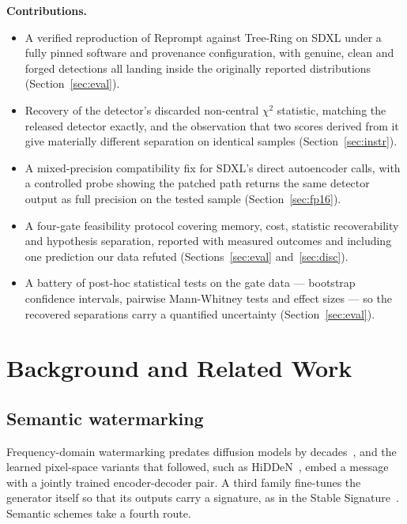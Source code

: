 \documentclass[10pt,twocolumn]{article}
\begin{document}
\vspace{2pt}
\noindent\textbf{Contributions.}
\begin{itemize}\itemsep2pt
  \item A verified reproduction of Reprompt against Tree-Ring on SDXL under a fully
        pinned software and provenance configuration, with genuine, clean and forged
        detections all landing inside the originally reported distributions
        (Section~\ref{sec:eval}).
  \item Recovery of the detector's discarded non-central $\chi^2$ statistic, matching
        the released detector exactly, and the observation that two scores derived
        from it give materially different separation on identical samples
        (Section~\ref{sec:instr}).
  \item A mixed-precision compatibility fix for SDXL's direct autoencoder calls,
        with a controlled probe showing the patched path returns the same detector
        output as full precision on the tested sample (Section~\ref{sec:fp16}).
  \item A four-gate feasibility protocol covering memory, cost, statistic
        recoverability and hypothesis separation, reported with measured outcomes and
        including one prediction our data refuted (Sections~\ref{sec:eval}
        and~\ref{sec:disc}).
  \item A battery of post-hoc statistical tests on the gate data --- bootstrap
        confidence intervals, pairwise Mann-Whitney tests and effect sizes --- so
        the recovered separations carry a quantified uncertainty
        (Section~\ref{sec:eval}).
\end{itemize}

\section{Background and Related Work}

\subsection{Semantic watermarking}

Frequency-domain watermarking predates diffusion models by decades~\cite{cox2007digital},
and the learned pixel-space variants that followed, such as
HiDDeN~\cite{zhu2018hidden}, embed a message with a jointly trained
encoder-decoder pair. A third family fine-tunes the generator itself so that its
outputs carry a signature, as in the Stable
Signature~\cite{fernandez2023stablesignature}. Semantic schemes take a fourth route.
\end{document}
